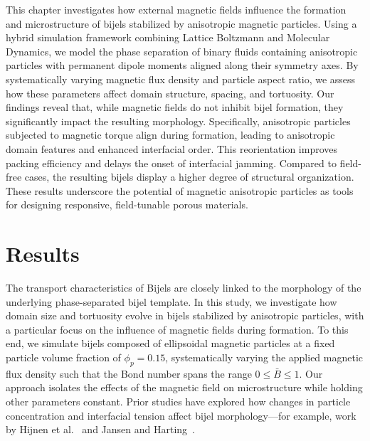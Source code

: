 This chapter investigates how external magnetic fields influence the formation and microstructure of bijels stabilized by anisotropic 
magnetic particles. Using a hybrid simulation framework combining Lattice Boltzmann and Molecular Dynamics, we model the phase separation 
of binary fluids containing anisotropic particles with permanent dipole moments aligned along their symmetry axes. By systematically varying 
magnetic flux density and particle aspect ratio, we assess how these parameters affect domain structure, spacing, and tortuosity. Our 
findings reveal that, while magnetic fields do not inhibit bijel formation, they significantly impact the resulting morphology. 
Specifically, anisotropic particles subjected to magnetic torque align during formation, leading to anisotropic domain features and 
enhanced interfacial order. This reorientation improves packing efficiency and delays the onset of interfacial jamming. Compared to 
field-free cases, the resulting bijels display a higher degree of structural organization. These results underscore the potential of 
magnetic anisotropic particles as tools for designing responsive, field-tunable porous materials.

\section{Results}

The transport characteristics of Bijels are closely linked to the morphology of the underlying 
phase-separated bijel template. In this study, we investigate how domain size and tortuosity evolve in bijels stabilized by anisotropic particles, 
with a particular focus on the influence of magnetic fields during formation.
To this end, we simulate bijels composed of ellipsoidal magnetic particles at a fixed particle volume fraction of \(\phi_p = 0.15\), systematically 
varying the applied magnetic flux density such that the Bond number spans the range \(0 \le \bar{B} \le 1\). Our approach isolates the effects of 
the magnetic field on microstructure while holding other parameters constant. Prior studies have explored how changes in particle concentration and 
interfacial tension affect bijel morphology—for example, work by Hijnen et al.~\cite{hijnen_bijels_2015} and Jansen and Harting~\cite{jansen_bijels_2011}.

